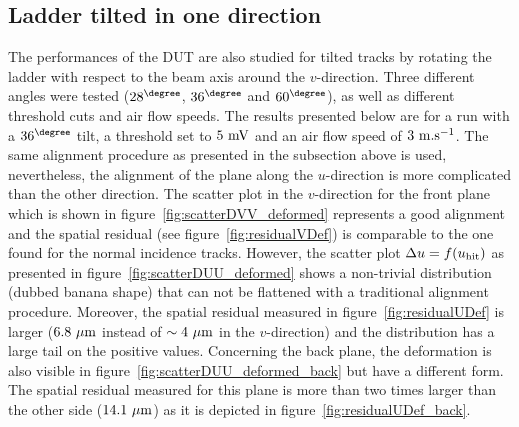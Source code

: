     \subsection{Ladder tilted in one direction}
    \label{subsec:deformation}

      The performances of the \gls{DUT} are also studied for tilted tracks by rotating the ladder with respect to the beam axis around the $v$-direction.
      Three different angles were tested ($28^{\degree}$, $36^{\degree}$ and $60^{\degree}$), as well as different threshold cuts and air flow speeds. 
      The results presented below are for a run with a $36^{\degree}$ tilt, a threshold set to $5~\rm{mV}$ and an air flow speed of $3~\rm{m.s}^{-1}$.
      The same alignment procedure as presented in the subsection above is used, nevertheless, the alignment of the plane along the $u$-direction is more complicated than the other direction.
      The scatter plot in the $v$-direction for the front plane which is shown in figure~\ref{fig:scatterDVV_deformed} represents a good alignment and the spatial residual (see figure~\ref{fig:residualVDef}) is comparable to the one found for the normal incidence tracks.
      However, the scatter plot $\Delta u = f(u_{\rm{hit}})$ as presented in figure~\ref{fig:scatterDUU_deformed} shows a non-trivial distribution (dubbed banana shape) that can not be flattened with a traditional alignment procedure.
      Moreover, the spatial residual measured in figure~\ref{fig:residualUDef} is larger ($6.8~\rm{\mu m}$ instead of $\sim 4~\rm{\mu m}$ in the $v$-direction) and the distribution has a large tail on the positive values.
      Concerning the back plane, the deformation is also visible in figure~\ref{fig:scatterDUU_deformed_back} but have a different form.
      The spatial residual measured for this plane is more than two times larger than the other side ($14.1~\rm{\mu m}$) as it is depicted in figure~\ref{fig:residualUDef_back}.

